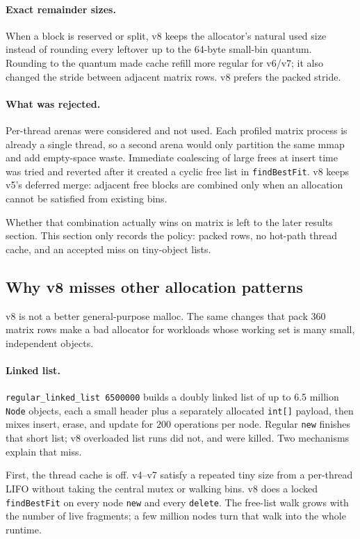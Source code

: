 \paragraph{Exact remainder sizes.}
When a block is reserved or split, v8 keeps the allocator's natural used
size instead of rounding every leftover up to the 64-byte small-bin quantum.
Rounding to the quantum made cache refill more regular for v6/v7; it also
changed the stride between adjacent matrix rows.
v8 prefers the packed stride.

\paragraph{What was rejected.}
Per-thread arenas were considered and not used.
Each profiled matrix process is already a single thread, so a second arena
would only partition the same mmap and add empty-space waste.
Immediate coalescing of large frees at insert time was tried and reverted
after it created a cyclic free list in \texttt{findBestFit}.
v8 keeps v5's deferred merge: adjacent free blocks are combined only when an
allocation cannot be satisfied from existing bins.

Whether that combination actually wins on matrix is left to the later results
section.
This section only records the policy: packed rows, no hot-path thread cache,
and an accepted miss on tiny-object lists.

\subsection{Why v8 misses other allocation patterns}

v8 is not a better general-purpose malloc.
The same changes that pack 360 matrix rows make a bad allocator for workloads
whose working set is many small, independent objects.

\paragraph{Linked list.}
\texttt{regular\_linked\_list 6500000} builds a doubly linked list of up to
6.5 million \texttt{Node} objects, each a small header plus a separately
allocated \texttt{int[]} payload, then mixes insert, erase, and update for
$200$ operations per node.
Regular \texttt{new} finishes that short list; v8 overloaded list runs did
not, and were killed.
Two mechanisms explain that miss.

First, the thread cache is off.
v4--v7 satisfy a repeated tiny size from a per-thread LIFO without taking the
central mutex or walking bins.
v8 does a locked \texttt{findBestFit} on every node \texttt{new} and every
\texttt{delete}.
The free-list walk grows with the number of live fragments; a few million
nodes turn that walk into the whole runtime.

